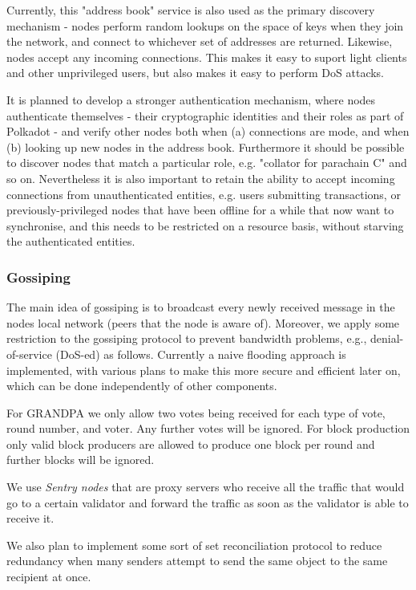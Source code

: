 Currently, this "address book" service is also used as the primary discovery mechanism - nodes perform random lookups on the space of keys when they join the network, and connect to whichever set of addresses are returned. Likewise, nodes accept any incoming connections. This makes it easy to suport light clients and other unprivileged users, but also makes it easy to perform DoS attacks.

It is planned to develop a stronger authentication mechanism, where nodes authenticate themselves - their cryptographic identities and their roles as part of Polkadot - and verify other nodes both when (a) connections are mode, and when (b) looking up new nodes in the address book. Furthermore it should be possible to discover nodes that match a particular role, e.g. "collator for parachain C" and so on. Nevertheless it is also important to retain the ability to accept incoming connections from unauthenticated entities, e.g. users submitting transactions, or previously-privileged nodes that have been offline for a while that now want to synchronise, and this needs to be restricted on a resource basis, without starving the authenticated entities.

\subsubsection{Gossiping} \label{sec:gossiping}
The main idea of gossiping is to broadcast every newly received message in the nodes local network (peers that the node is aware of). Moreover, we apply some restriction to the gossiping protocol to prevent bandwidth problems, e.g., denial-of-service (DoS-ed) as follows. Currently a naive flooding approach is implemented, with various plans to make this more secure and efficient later on, which can be done independently of other components.

For GRANDPA we only allow two votes being received for each type of vote, round number, and voter. Any further votes will be ignored. For block production only valid block producers are allowed to produce one block per round and further blocks will be ignored.

We use \emph{Sentry nodes} that are proxy servers who receive all the traffic that would go to a certain validator and forward the traffic as soon as the validator is able to receive it.

We also plan to implement some sort of set reconciliation protocol to reduce redundancy when many senders attempt to send the same object to the same recipient at once.

